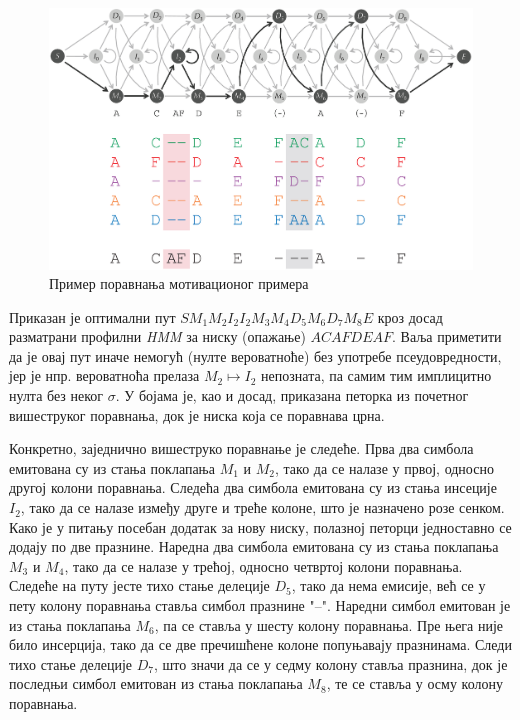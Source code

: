 \documentclass[12pt,oneside]{memoir}
\begin{document}
\begin{CJK}{UTF8}{ipxm}
\begin{figure}[H]
  \centering
  \includegraphics[width=\textwidth]{poravnanje.png}
  \caption{Пример поравнања мотивационог примера\cite{compeau2015}}
  \label{fig:poravnanje}
\end{figure}

Приказан је оптимални пут $S M_1 M_2 I_2 I_2 M_3 M_4 D_5 M_6 D_7 M_8 E$ кроз досад разматрани профилни \textit{HMM} за ниску (опажање) $ACAFDEAF$. Ваља приметити да је овај пут иначе немогућ (нулте вероватноће) без употребе псеудовредности, јер је нпр. вероватноћа прелаза $M_2 \mapsto I_2$ непозната, па самим тим имплицитно нулта без неког $\sigma$. У бојама је, као и досад, приказана петорка из почетног вишеструког поравнања, док је ниска која се поравнава црна.

Конкретно, заједнично вишеструко поравнање је следеће. Прва два симбола емитована су из стања поклапања $M_1$ и $M_2$, тако да се налазе у првој, односно другој колони поравнања. Следећа два симбола емитована су из стања инсеције $I_2$, тако да се налазе између друге и треће колоне, што је назначено розе сенком. Како је у питању посебан додатак за нову ниску, полазној петорци једноставно се додају по две празнине. Наредна два симбола емитована су из стања поклапања $M_3$ и $M_4$, тако да се налазе у трећој, односно четвртој колони поравнања. Следеће на путу јесте тихо стање делеције $D_5$, тако да нема емисије, већ се у пету колону поравнања ставља симбол празнине "--". Наредни симбол емитован је из стања поклапања $M_6$, па се ставља у шесту колону поравнања. Пре њега није било инсерција, тако да се две пречишћене колоне попуњавају празнинама. Следи тихо стање делеције $D_7$, што значи да се у седму колону ставља празнина, док је последњи симбол емитован из стања поклапања $M_8$, те се ставља у осму колону поравнања.


\end{CJK}
\end{document}
